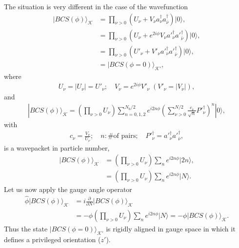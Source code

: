 The situation is very different in the case of the wavefunction
\begin{align*}
|BCS(\phi)\rangle_{\mathcal{K}} &=\prod_{\nu>0}\left(U_\nu+V_\nu a_\nu^\dagger a_{\bar \nu}^{\dagger}\right)|0\rangle,\\
&=\prod_{\nu>0}\left(U_\nu+e^{2i\phi}V_\nu a'^\dagger_\nu a'^{\dagger}_{\bar \nu}\right)|0\rangle,\\
&=\prod_{\nu>0}\left(U'_\nu+V'_\nu a'^\dagger_\nu a'^{\dagger}_{\bar \nu}\right)|0\rangle,\\
&=|BCS(\phi=0)\rangle_{\mathcal{K'}},
\end{align*}
where
\begin{align*}
U_\nu=|U_\nu|=U'_\nu;\quad V_\nu=e^{2i\phi}V'_\nu \;(V'_\nu=|V_\nu|),
\end{align*}
and
\begin{align*}
|BCS(\phi)\rangle_{\mathcal{K}}=\left(\prod_{\nu>0}U_\nu\right)\sum_{n=0,1,2}^{N_0/2}e^{i2n\phi}\left(\sum_{\nu>0}^{N/2}\frac{c_\nu}{\sqrt{n}}P'^\dagger_\nu\right)^n|0\rangle,
\end{align*}
with
\begin{align*}
c_\nu=\frac{V_\nu}{U_\nu};\quad n:\text{\# of pairs};\quad P'^\dagger_\nu=a'^\dagger_\nu a'^\dagger_{\bar\nu},
\end{align*}
is a wavepacket in particle number,
\begin{align}\label{eqalpha}
\nonumber |BCS(\phi)\rangle_{\mathcal{K}}&=\left(\prod_{\nu>0}U_\nu\right)\sum_{n}e^{i2n\phi}|2n\rangle,\\
&=\left(\prod_{\nu>0}U_\nu\right)\sum_{n}e^{i2n\phi}|N\rangle.
\end{align}
Let us now apply the gauge angle operator 
\begin{align}
\hat{\phi}|BCS(\phi)\rangle_{\mathcal{K}}&=i\frac{\partial}{\partial \nonumber N}|BCS(\phi)\rangle_{\mathcal{K}}\\
\nonumber&=-\phi\left(\prod_{\nu>0}U_\nu\right)\sum_{n}e^{i2n\phi}|N\rangle=-\phi|BCS(\phi)\rangle_{\mathcal{K}}.
\end{align}
Thus the state $|BCS(\phi=0)\rangle_{\mathcal{K}'}$ is rigidly aligned in gauge space in which it defines a privileged orientation ($z'$).


